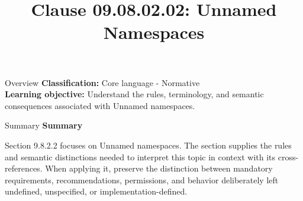 \documentclass[10pt,letterpaper]{article}
\title{Clause 09.08.02.02: Unnamed Namespaces}
\author{}
\date{}
\begin{document}
\maketitle
\begin{CornellOverviewBox}{Overview}
\textbf{Classification:} Core language - Normative\\[2pt]
\textbf{Learning objective:} Understand the rules, terminology, and semantic consequences associated with Unnamed namespaces.
\end{CornellOverviewBox}\begin{CornellSummaryBox}{Summary}
{\sffamily\bfseries\color{Accent} Summary}\par\vspace{3pt}Section 9.8.2.2 focuses on Unnamed namespaces. The section supplies the rules and semantic distinctions needed to interpret this topic in context with its cross-references. When applying it, preserve the distinction between mandatory requirements, recommendations, permissions, and behavior deliberately left undefined, unspecified, or implementation-defined.
\end{CornellSummaryBox}
\end{document}

